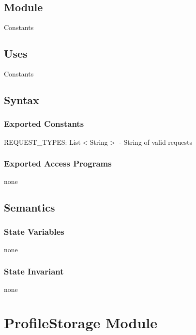 \documentclass[12pt, titlepage]{article}
\newcommand{\newConstantsModule}[6]{
	\subsection* {Module}
		#1
	\subsection* {Uses}
		#2
	\subsection* {Syntax}
		\subsubsection* {Exported Constants}
			#3
		\subsubsection* {Exported Access Programs}
			#4
	\subsection* {Semantics}
		\subsubsection* {State Variables}
			#5
		\subsubsection* {State Invariant}
			#6
}
\begin{document}
\label{Constants}
\newConstantsModule{Constants}
	{%
		Constants
	}
	{%
		REQUEST\_TYPES: List$<$String$>$ - String of valid requests
	}
	{%
	none
	}
	{%
		none\\
	}
	{%
        none
	}
% 		
	
\newpage

\section {ProfileStorage Module}

\label{ProfileStorage}
\end{document}
